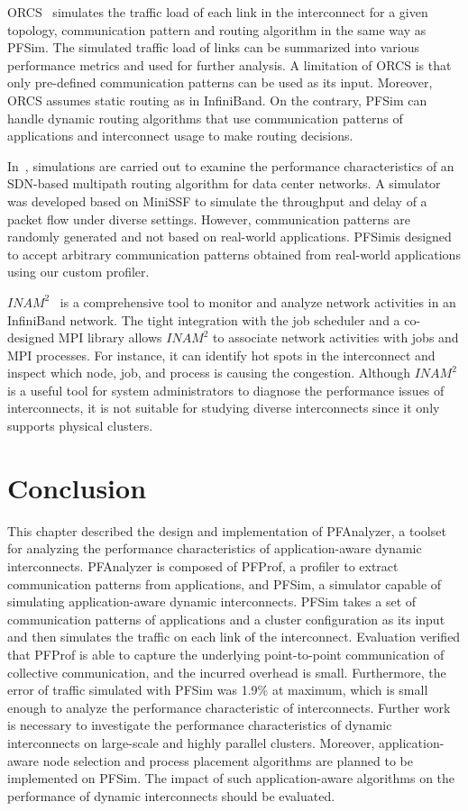 ORCS~\autocite{Schneider2009} simulates the traffic load of each link in
the interconnect for a given topology, communication pattern and routing
algorithm in the same way as PFSim. The simulated traffic load of links can be
summarized into various performance metrics and used for further analysis. A
limitation of ORCS is that only pre-defined communication patterns can be used
as its input. Moreover, ORCS assumes static routing as in InfiniBand. On the
contrary, PFSim can handle dynamic routing algorithms that use communication
patterns of applications and interconnect usage to make routing decisions.

In~\autocite{Jo2015}, simulations are carried out to examine the
performance characteristics of an SDN-based multipath routing algorithm
for data center networks. A simulator was developed based on MiniSSF to
simulate the throughput and delay of a packet flow under diverse
settings. However, communication patterns are randomly generated and not
based on real-world applications. PFSimis designed to accept arbitrary
communication patterns obtained from real-world applications using our custom
profiler.

\(\mathit{INAM}^2\)~\autocite{Subramoni2016} is a comprehensive tool to
monitor and analyze network activities in an InfiniBand network. The
tight integration with the job scheduler and a co-designed MPI library
allows \(\mathit{INAM}^2\) to associate network activities with jobs and
MPI processes. For instance, it can identify hot spots in the
interconnect and inspect which node, job, and process is causing the
congestion. Although \(\mathit{INAM}^2\) is a useful tool for system
administrators to diagnose the performance issues of interconnects, it
is not suitable for studying diverse interconnects since it only
supports physical clusters.

\section{Conclusion}\label{sec:ii-conclusion}

This chapter described the design and implementation of PFAnalyzer, a
toolset for analyzing the performance characteristics of
application-aware dynamic interconnects. PFAnalyzer is composed of
PFProf, a profiler to extract communication patterns from applications,
and PFSim, a simulator capable of simulating application-aware dynamic
interconnects. PFSim takes a set of communication patterns of
applications and a cluster configuration as its input and then simulates
the traffic on each link of the interconnect. Evaluation verified that PFProf
is able to capture the underlying point-to-point communication of collective
communication, and the incurred overhead is small. Furthermore, the error
of traffic simulated with PFSim was 1.9\% at maximum, which is small enough to
analyze the performance characteristic of interconnects. Further work is
necessary to investigate the performance characteristics of dynamic
interconnects on large-scale and highly parallel clusters. Moreover,
application-aware node selection and process placement algorithms are planned
to be implemented on PFSim. The impact of such application-aware algorithms on
the performance of dynamic interconnects should be evaluated.
